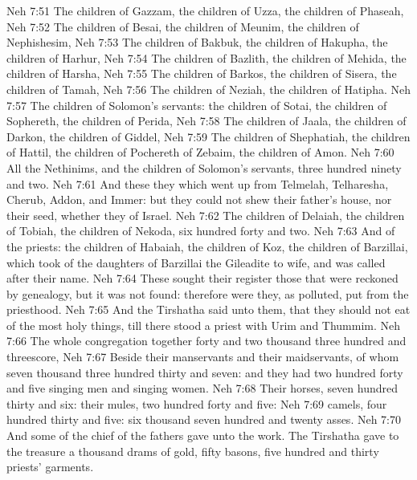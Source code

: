 \vs Neh 7:51 The children of Gazzam, the children of Uzza, the children of Phaseah,
\vs Neh 7:52 The children of Besai, the children of Meunim, the children of Nephishesim,
\vs Neh 7:53 The children of Bakbuk, the children of Hakupha, the children of Harhur,
\vs Neh 7:54 The children of Bazlith, the children of Mehida, the children of Harsha,
\vs Neh 7:55 The children of Barkos, the children of Sisera, the children of Tamah,
\vs Neh 7:56 The children of Neziah, the children of Hatipha.
\vs Neh 7:57 The children of Solomon's servants: the children of Sotai, the children of Sophereth, the children of Perida,
\vs Neh 7:58 The children of Jaala, the children of Darkon, the children of Giddel,
\vs Neh 7:59 The children of Shephatiah, the children of Hattil, the children of Pochereth of Zebaim, the children of Amon.
\vs Neh 7:60 All the Nethinims, and the children of Solomon's servants,  three hundred ninety and two.
\vs Neh 7:61 And these  they which went up  from Telmelah, Telharesha, Cherub, Addon, and Immer: but they could not shew their father's house, nor their seed, whether they  of Israel.
\vs Neh 7:62 The children of Delaiah, the children of Tobiah, the children of Nekoda, six hundred forty and two.
\vs Neh 7:63 And of the priests: the children of Habaiah, the children of Koz, the children of Barzillai, which took  of the daughters of Barzillai the Gileadite to wife, and was called after their name.
\vs Neh 7:64 These sought their register  those that were reckoned by genealogy, but it was not found: therefore were they, as polluted, put from the priesthood.
\vs Neh 7:65 And the Tirshatha said unto them, that they should not eat of the most holy things, till there stood  a priest with Urim and Thummim.
\vs Neh 7:66 The whole congregation together  forty and two thousand three hundred and threescore,
\vs Neh 7:67 Beside their manservants and their maidservants, of whom  seven thousand three hundred thirty and seven: and they had two hundred forty and five singing men and singing women.
\vs Neh 7:68 Their horses, seven hundred thirty and six: their mules, two hundred forty and five:
\vs Neh 7:69  camels, four hundred thirty and five: six thousand seven hundred and twenty asses.
\vs Neh 7:70 And some of the chief of the fathers gave unto the work. The Tirshatha gave to the treasure a thousand drams of gold, fifty basons, five hundred and thirty priests' garments.

